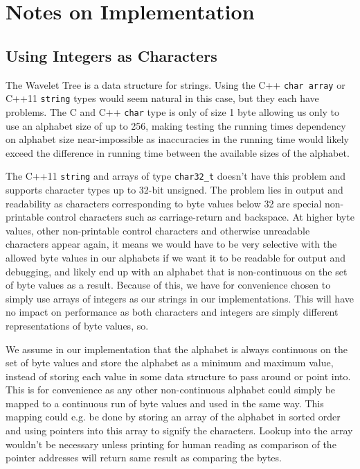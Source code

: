\section{Notes on Implementation}

\subsection{Using Integers as Characters}
\label{sec:UsingIntAsChar}
The Wavelet Tree is a data structure for strings. 
Using the C++ \texttt{char array} or C++11 \texttt{string} types would seem natural in this case, but they each have problems.
The C and C++ \texttt{char} type is only of size 1 byte allowing us only to use an alphabet size of up to 256, making testing the running times dependency on alphabet size near-impossible as inaccuracies in the running time would likely exceed the difference in running time between the available sizes of the alphabet.

The C++11 \texttt{string} and arrays of type \texttt{char32\_t} doesn't have this problem and supports character types up to 32-bit unsigned. 
The problem lies in output and readability as characters corresponding to byte values below 32 are special non-printable control characters such as carriage-return and backspace. 
At higher byte values, other non-printable control characters and otherwise unreadable characters appear again, it means we would have to be very selective with the allowed byte values in our alphabets if we want it to be readable for output and debugging, and likely end up with an alphabet that is non-continuous on the set of byte values as a result.
Because of this, we have for convenience chosen to simply use arrays of integers as our strings in our implementations.
This will have no impact on performance as both characters and integers are simply different representations of byte values, so.

We assume in our implementation that the alphabet is always continuous on the set of byte values and store the alphabet as a minimum and maximum value, instead of storing each value in some data structure to pass around or point into.
This is for convenience as any other non-continuous alphabet could simply be mapped to a continuous run of byte values and used in the same way. 
This mapping could e.g. be done by storing an array of the alphabet in sorted order and using pointers into this array to signify the characters. 
Lookup into the array wouldn't be necessary unless printing for human reading as comparison of the pointer addresses will return same result as comparing the bytes.

